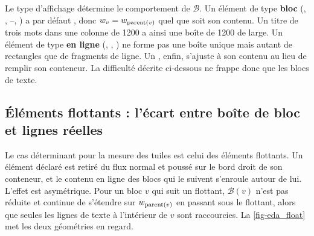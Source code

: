 Le type d'affichage détermine le comportement de $\mathcal{B}$. Un élément de
type \textbf{bloc} (, , --,
) a par défaut , donc $w_v = w_{\operatorname{\text{\normalfont parent}}(v)}$
quel que soit son contenu. Un titre de trois mots dans une colonne de
\SI{1200}{\pixel} a ainsi une boîte de \SI{1200}{\pixel} de large. Un élément de
type \textbf{en ligne} (, , ) ne forme pas une
boîte unique mais autant de rectangles que de fragments de ligne. Un
, enfin, s'ajuste à son contenu au lieu de remplir son conteneur.
La difficulté décrite ci-dessous ne frappe donc que les blocs de texte.

\subsection{Éléments flottants : l'écart entre boîte de bloc et lignes réelles}
\label{sec-eda_dom_float}

Le cas déterminant pour la mesure des tuiles est celui des éléments flottants.
Un élément déclaré  est retiré du flux normal et poussé sur
le bord droit de son conteneur, et le contenu en ligne des blocs qui le suivent
s'enroule autour de lui. L'effet est asymétrique. Pour un bloc $v$ qui suit un
flottant, $\mathcal{B}(v)$ n'est pas réduite et continue de s'étendre sur
$w_{\operatorname{\text{\normalfont parent}}(v)}$ en passant sous le flottant, alors que seules les lignes de
texte à l'intérieur de $v$ sont raccourcies. La \cref{fig-eda_float} met les
deux géométries en regard.

